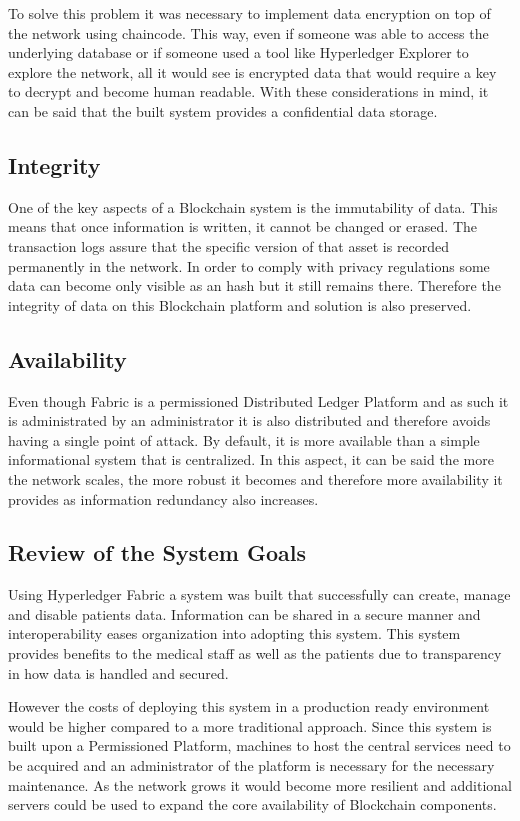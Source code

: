 To solve this problem it was necessary to implement data encryption on top of
the network using chaincode. This way, even if someone was able to access the
underlying database or if someone used a tool like Hyperledger Explorer to
explore the network, all it would see is encrypted data that would require a
key to decrypt and become human readable. With these considerations in mind, it
can be said that the built system provides a confidential data storage.

\subsection{Integrity}

One of the key aspects of a Blockchain system is the immutability of data. This
means that once information is written, it cannot be changed or erased. The
transaction logs assure that the specific version of that asset is recorded
permanently in the network. In order to comply with privacy regulations some
data can become only visible as an hash but it still remains there. Therefore
the integrity of data on this Blockchain platform and solution is also
preserved.

\subsection{Availability}

Even though Fabric is a permissioned Distributed Ledger Platform and as such it
is administrated by an administrator it is also distributed and therefore
avoids having a single point of attack. By default, it is more available than a
simple informational system that is centralized. In this aspect, it can be said
the more the network scales, the more robust it becomes and therefore more
availability it provides as information redundancy also increases.

\subsection{Review of the System Goals}

Using Hyperledger Fabric a system was built that successfully can create, manage
and disable patients data. Information can be shared in a secure manner and
interoperability eases organization into adopting this system. This system
provides benefits to the medical staff as well as the patients due to
transparency in how data is handled and secured.

However the costs of deploying this system in a production ready environment
would be higher compared to a more traditional approach. Since this system is
built upon a Permissioned Platform, machines to host the central services need
to be acquired and an administrator of the platform is necessary for the
necessary maintenance. As the network grows it would become more resilient and
additional servers could be used to expand the core availability of Blockchain
components.

